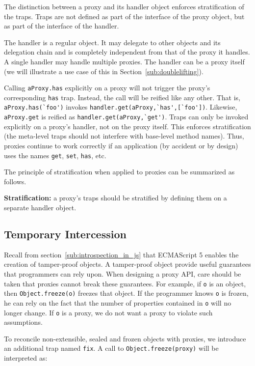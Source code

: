 \documentclass{sig-alternate}
\begin{document}
The distinction between a proxy and its handler object enforces stratification of the traps. Traps are not defined as part of the interface of the proxy object, but as part of the interface of the handler.

The handler is a regular object. It may delegate to other objects and its delegation chain and is completely independent from that of the proxy it handles. A single handler may handle multiple proxies. The handler can be a proxy itself (we will illustrate a use case of this in Section~\ref{sub:doublelifting}).

Calling \lstinline{aProxy.has} explicitly on a proxy will not trigger the proxy's corresponding \texttt{has} trap. Instead, the call will be reified like any other. That is, \lstinline{aProxy.has(`foo')} invokes \lstinline{handler.get(aProxy,`has',[`foo'])}. Likewise, \lstinline{aProxy.get} is reified as \lstinline{handler.get(aProxy,`get')}. Traps can only be invoked explicitly on a proxy's handler, not on the proxy itself. This enforces stratification (the meta-level traps should not interfere with base-level method names). Thus, proxies continue to work correctly if an application (by accident or by design) uses the names \texttt{get}, \texttt{set}, \texttt{has}, etc.

The principle of stratification when applied to proxies can be summarized as follows.

\textbf{Stratification:} a proxy's traps should be stratified by defining them on a separate handler object.

\subsection{Temporary Intercession}
\label{sub:immutability}

Recall from section~\ref{sub:introspection_in_js} that ECMAScript 5 enables the creation of tamper-proof objects. A tamper-proof object provide useful guarantees that programmers can rely upon. When designing a proxy API, care should be taken that proxies cannot break these guarantees. For example, if \texttt{o} is an object, then \texttt{Object.freeze(o)} freezes that object. If the programmer knows \texttt{o} is frozen, he can rely on the fact that the number of properties contained in \texttt{o} will no longer change. If \texttt{o} is a proxy, we do not want a proxy to violate such assumptions.

To reconcile non-extensible, sealed and frozen objects with proxies, we introduce an additional trap named \texttt{fix}. A call to \texttt{Object.freeze(proxy)} will be interpreted as:
\end{document}
